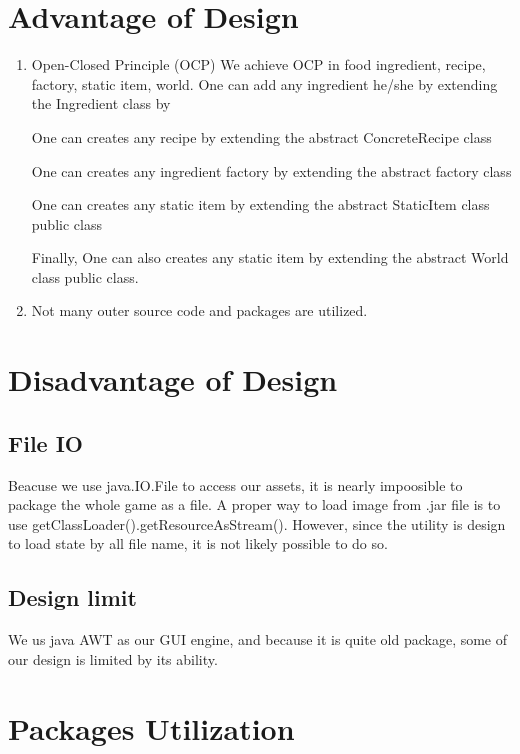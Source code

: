 \section{Advantage of Design}
\begin{enumerate}
\item Open-Closed Principle (OCP)
    We achieve OCP in food ingredient, recipe, factory, static item, world.
    One can add any ingredient he/she by extending the Ingredient class by 


One can creates any recipe by extending the abstract ConcreteRecipe class


One can creates any ingredient factory by extending the abstract factory class


One can creates any static item by extending the abstract StaticItem class public class


Finally, One can also creates any static item by extending the abstract World class public class.
\item Not many outer source code and packages are utilized.
\end{enumerate}

\section{Disadvantage of Design}
\subsection{File IO}
Beacuse we use java.IO.File to access our assets, it is nearly impoosible to package the whole game as a file.
A proper way to load image from .jar file is to use getClassLoader().getResourceAsStream(). However, since the utility is design to load state by
all file name, it is not likely possible to do so.
\subsection{Design limit}
We us java AWT as our GUI engine, and because it is quite old package, some of our design is limited by its ability.

\section{Packages Utilization}